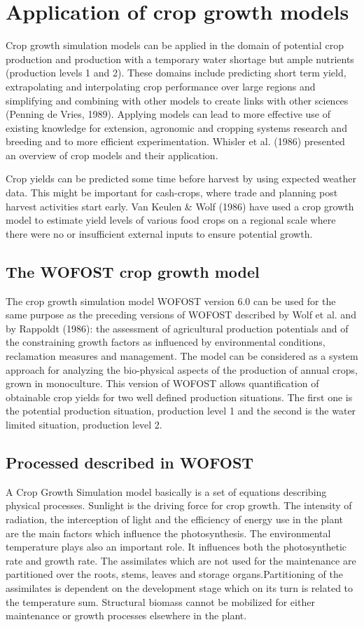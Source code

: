 \section{Application of crop growth models}
Crop growth simulation models can be applied in the domain of potential crop
production and production with a temporary water shortage but ample nutrients
(production levels 1 and 2). These domains include predicting short term yield,
extrapolating and interpolating crop performance over large regions and simplifying
and combining with other models to create links with other sciences (Penning de
Vries, 1989). Applying models can lead to more effective use of existing knowledge
for extension, agronomic and cropping systems research and breeding and to more
efficient experimentation. Whisler et al. (1986) presented an overview of crop models
and their application.

Crop yields can be predicted some time before harvest by using expected weather
data. This might be important for cash-crops, where trade and planning post harvest
activities start early.
Van Keulen \& Wolf (1986) have used a crop growth model to estimate yield levels of
various food crops on a regional scale where there were no or insufficient external
inputs to ensure potential growth.

\subsection{The WOFOST crop growth model}
The crop growth simulation model WOFOST version 6.0 can be used for the same
purpose as the preceding versions of WOFOST described by Wolf et al. and by
Rappoldt (1986): the assessment of agricultural production potentials and of the
constraining growth factors as influenced by environmental conditions, reclamation
measures and management. The model can be considered as a system approach for
analyzing the bio-physical aspects of the production of annual crops, grown in
monoculture. This version of WOFOST allows quantification of obtainable crop
yields for two well defined production situations. The first one is the potential
production situation, production level 1 and the second is the water limited situation,
production level 2.

\subsection{Processed described in WOFOST}
A Crop Growth Simulation model basically is a set of equations describing physical
processes. Sunlight is the driving force for crop growth. The intensity of radiation, the
interception of light and the efficiency of energy use in the plant are the main factors
which influ\-ence the photosynthesis. The environmental temperature plays also an
important role. It influences both the photosynthetic rate and growth rate. The
assimilates which are not used for the maintenance are partitioned over the roots,
stems, leaves and storage organs.Partitioning of the assimilates is dependent on the
development stage which on its turn is related to the temperature sum. Structural
biomass cannot be mobilized for either maintenance or growth processes elsewhere in
the plant.

